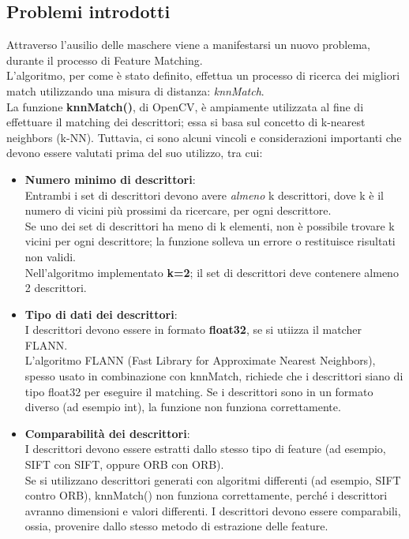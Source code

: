 \documentclass[12pt,a4paper,openright,twoside]{book}
\begin{document}
\subsection{Problemi introdotti}
Attraverso l'ausilio delle maschere viene a manifestarsi un nuovo problema, durante il processo di Feature Matching.\\
L'algoritmo, per come è stato definito, effettua un processo di ricerca dei migliori match utilizzando una misura di distanza: {\itshape knnMatch}.\\

La funzione \textbf{knnMatch()}, di OpenCV, è ampiamente utilizzata al fine di effettuare il matching dei descrittori; essa si basa sul concetto di k-nearest neighbors (k-NN). Tuttavia, ci sono alcuni vincoli e considerazioni importanti che devono essere valutati prima del suo utilizzo, tra cui:
\begin{itemize}
\item \textbf{Numero minimo di descrittori}:\\
Entrambi i set di descrittori devono avere {\itshape almeno} k descrittori, dove k è il numero di vicini più prossimi da ricercare, per ogni descrittore.\\
Se uno dei set di descrittori ha meno di k elementi, non è possibile trovare k vicini per ogni descrittore; la funzione solleva un errore o restituisce risultati non validi. \\
Nell'algoritmo implementato \textbf{k=2}; il set di descrittori deve contenere almeno 2 descrittori.

\item \textbf{Tipo di dati dei descrittori}:\\
I descrittori devono essere in formato \textbf{float32}, se si utiizza il matcher FLANN.\\
L'algoritmo FLANN (Fast Library for Approximate Nearest Neighbors), spesso usato in combinazione con knnMatch, richiede che i descrittori siano di tipo float32 per eseguire il matching. Se i descrittori sono in un formato diverso (ad esempio int), la funzione non funziona correttamente.

\item \textbf{Comparabilità dei descrittori}:\\
I descrittori devono essere estratti dallo stesso tipo di feature (ad esempio, SIFT con SIFT, oppure ORB con ORB). \\
Se si utilizzano descrittori generati con algoritmi differenti (ad esempio, SIFT contro ORB), knnMatch() non funziona correttamente, perché i descrittori avranno dimensioni e valori differenti. I descrittori devono essere comparabili, ossia, provenire dallo stesso metodo di estrazione delle feature.

\end{itemize}
\end{document}
